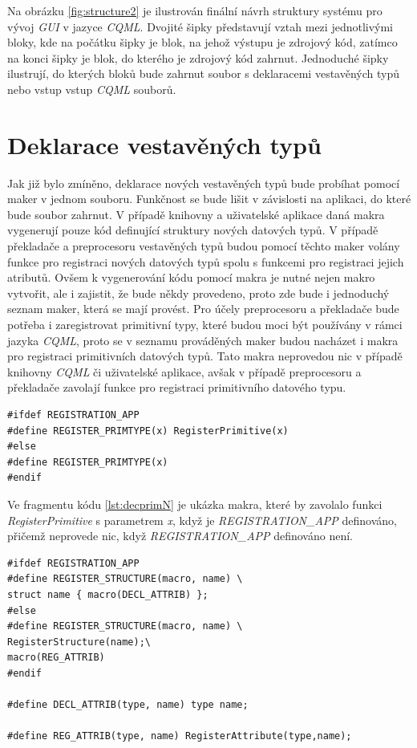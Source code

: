 \documentclass[11pt,twoside,a4paper]{book}
\begin{document}
Na obrázku \ref{fig:structure2} je ilustrován finální návrh struktury systému pro vývoj \textit{GUI} v jazyce \textit{CQML}. Dvojité šipky představují vztah mezi jednotlivými bloky, kde na počátku šipky je blok, na jehož výstupu je zdrojový kód, zatímco na konci šipky je blok, do kterého je zdrojový kód zahrnut. Jednoduché šipky ilustrují, do kterých bloků bude zahrnut soubor s deklaracemi vestavěných typů nebo vstup vstup \textit{CQML} souborů.

\section{\label{SEC:macN}Deklarace vestavěných typů}
Jak již bylo zmíněno, deklarace nových vestavěných typů bude probíhat pomocí maker v jednom souboru. Funkčnost se bude lišit v závislosti na aplikaci, do které bude soubor zahrnut. V případě knihovny a uživatelské aplikace daná makra vygenerují pouze kód definující struktury nových datových typů. V případě překladače a preprocesoru vestavěných typů budou pomocí těchto maker volány funkce pro registraci nových datových typů spolu s funkcemi pro registraci jejich atributů. Ovšem k vygenerování kódu pomocí makra je nutné nejen makro vytvořit, ale i zajistit, že bude někdy provedeno, proto zde bude i jednoduchý seznam maker, která se mají provést. Pro účely preprocesoru a překladače bude potřeba i zaregistrovat primitivní typy, které budou moci být používány v rámci jazyka \textit{CQML}, proto se v seznamu prováděných maker budou nacházet i makra pro registraci primitivních datových typů. Tato makra neprovedou nic v případě knihovny \textit{CQML} či uživatelské aplikace, avšak v případě preprocesoru a překladače zavolají funkce pro registraci primitivního datového typu.

\begin{lstlisting}[frame=single,caption=Makro registrující datový typ\, v případě\, že je definováno jiné makro. ,label=lst:decprimN]
#ifdef REGISTRATION_APP
#define REGISTER_PRIMTYPE(x) RegisterPrimitive(x)
#else
#define REGISTER_PRIMTYPE(x)
#endif
\end{lstlisting}
Ve fragmentu kódu \ref{lst:decprimN} je ukázka makra, které by zavolalo funkci \textit{RegisterPrimitive} s parametrem \textit{x}, když je \textit{REGISTRATION\_APP} definováno, přičemž neprovede nic, když \textit{REGISTRATION\_APP} definováno není.


\begin{lstlisting}[frame=single,caption=Makro\, které registruje strukturu nebo vypíše její deklaraci\, v závislosti na jiném makru. ,label=lst:decN]
#ifdef REGISTRATION_APP
#define REGISTER_STRUCTURE(macro, name) \
struct name { macro(DECL_ATTRIB) };
#else
#define REGISTER_STRUCTURE(macro, name) \
RegisterStructure(name);\
macro(REG_ATTRIB) 
#endif

#define DECL_ATTRIB(type, name) type name;

#define REG_ATTRIB(type, name) RegisterAttribute(type,name);
\end{lstlisting}
  
\end{document}
